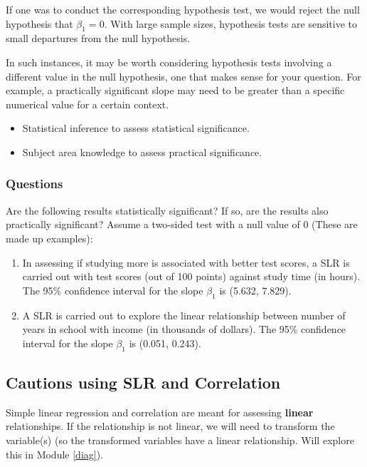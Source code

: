 \documentclass[
]{book}
\providecommand{\tightlist}{%
  \setlength{\itemsep}{0pt}\setlength{\parskip}{0pt}}
\begin{document}
If one was to conduct the corresponding hypothesis test, we would reject the null hypothesis that \(\beta_1 = 0\). With large sample sizes, hypothesis tests are sensitive to small departures from the null hypothesis.

In such instances, it may be worth considering hypothesis tests involving a different value in the null hypothesis, one that makes sense for your question. For example, a practically significant slope may need to be greater than a specific numerical value for a certain context.

\begin{itemize}
\tightlist
\item
  Statistical inference to assess statistical significance.
\item
  Subject area knowledge to assess practical significance.
\end{itemize}

\hypertarget{questions}{%
\subsubsection{Questions}\label{questions}}

Are the following results statistically significant? If so, are the results also practically significant? Assume a two-sided test with a null value of 0 (These are made up examples):

\begin{enumerate}
\def\labelenumi{\arabic{enumi}.}
\item
  In assessing if studying more is associated with better test scores, a SLR is carried out with test scores (out of 100 points) against study time (in hours). The 95\% confidence interval for the slope \(\beta_1\) is (5.632, 7.829).
\item
  A SLR is carried out to explore the linear relationship between number of years in school with income (in thousands of dollars). The 95\% confidence interval for the slope \(\beta_1\) is (0.051, 0.243).
\end{enumerate}

\hypertarget{cautions-using-slr-and-correlation}{%
\subsection{Cautions using SLR and Correlation}\label{cautions-using-slr-and-correlation}}

Simple linear regression and correlation are meant for assessing \textbf{linear} relationships. If the relationship is not linear, we will need to transform the variable(s) (so the transformed variables have a linear relationship. Will explore this in Module \ref{diag}).
\end{document}

